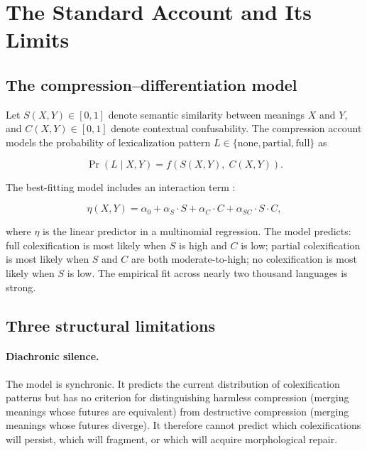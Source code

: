 \documentclass[12pt]{article}
\theoremstyle{rthm}
\theoremstyle{rdef}
\theoremstyle{remark}
\begin{document}
\section{The Standard Account and Its Limits}
\label{sec:standard}

\subsection{The compression--differentiation model}

Let $S(X,Y) \in [0,1]$ denote semantic similarity between meanings $X$ and $Y$,
and $C(X,Y) \in [0,1]$ denote contextual confusability. The compression account
models the probability of lexicalization pattern $L \in \{\text{none},
\text{partial}, \text{full}\}$ as

\[
\Pr(L \mid X, Y) = f\!\left(S(X,Y),\; C(X,Y)\right).
\]

The best-fitting model includes an interaction term \cite{brochhagen2026}:

\begin{equation}
\label{eq:standard}
\eta(X,Y) = \alpha_0 + \alpha_S \cdot S + \alpha_C \cdot C
           + \alpha_{SC} \cdot S \cdot C,
\end{equation}

where $\eta$ is the linear predictor in a multinomial regression. The model
predicts: full colexification is most likely when $S$ is high and $C$ is low;
partial colexification is most likely when $S$ and $C$ are both
moderate-to-high; no colexification is most likely when $S$ is low. The
empirical fit across nearly two thousand languages is strong.

\subsection{Three structural limitations}

\paragraph{Diachronic silence.}
The model is synchronic. It predicts the current distribution of colexification
patterns but has no criterion for distinguishing harmless compression (merging
meanings whose futures are equivalent) from destructive compression (merging
meanings whose futures diverge). It therefore cannot predict which colexifications
will persist, which will fragment, or which will acquire morphological repair.
\end{document}
